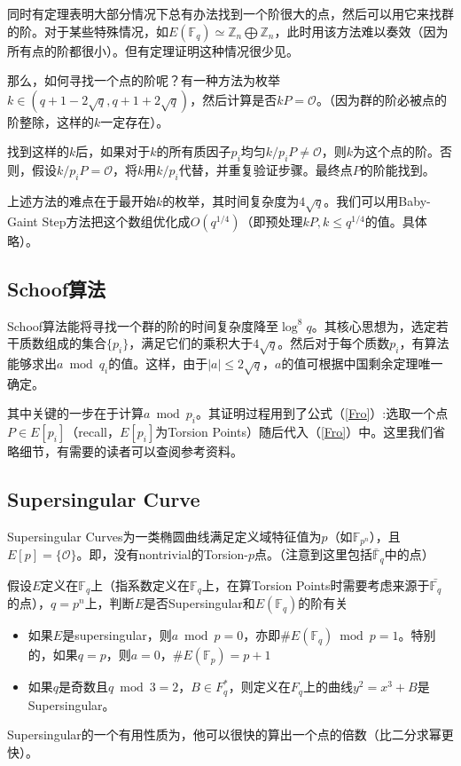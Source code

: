 \documentclass[12pt]{article}
\newcommand{\oo}{\mathcal{O}}
\newcommand{\fp}{\mathbb{F}_p}
\newcommand{\fpn}{\mathbb{F}_{p^n}}
\newcommand{\fq}{\mathbb{F}_q}
\begin{document}
同时有定理表明大部分情况下总有办法找到一个阶很大的点，然后可以用它来找群的阶。对于某些特殊情况，如$E(\mathbb{F}_q) \simeq \mathbb{Z}_n \bigoplus  \mathbb{Z}_n$，此时用该方法难以奏效（因为所有点的阶都很小）。但有定理证明这种情况很少见。

那么，如何寻找一个点的阶呢？有一种方法为枚举$k \in (q+1-2\sqrt{q},q+1+2\sqrt{q})$，然后计算是否$kP = \oo$。（因为群的阶必被点的阶整除，这样的$k$一定存在）。

找到这样的$k$后，如果对于$k$的所有质因子$p_i$均匀$k/p_i P \neq \oo$，则$k$为这个点的阶。否则，假设$k/p_i P = \oo$，将$k$用$k/p_i$代替，并重复验证步骤。最终点$P$的阶能找到。

上述方法的难点在于最开始$k$的枚举，其时间复杂度为$4\sqrt{q}$。我们可以用Baby-Gaint Step方法把这个数组优化成$O(q^{1/4})$（即预处理$kP, k \leq q^{1/4}$的值。具体略）。
\subsection{Schoof算法}
Schoof算法能将寻找一个群的阶的时间复杂度降至$\log^8 q$。其核心思想为，选定若干质数组成的集合$\{p_i\}$，满足它们的乘积大于$4\sqrt{q}$。然后对于每个质数$p_i$，有算法能够求出$a \bmod q_i$的值。这样，由于$|a| \leq 2\sqrt{q}$，$a$的值可根据中国剩余定理唯一确定。

其中关键的一步在于计算$a \bmod p_i$。其证明过程用到了公式（\ref{Fro}）:选取一个点$P \in E[p_i]$（recall，$E[p_i]$为Torsion Points）随后代入（\ref{Fro}）中。这里我们省略细节，有需要的读者可以查阅参考资料。
\subsection{Supersingular Curve}
Supersingular Curves为一类椭圆曲线满足定义域特征值为$p$（如$\fpn$），且$E[p] = \{\oo \}$。即，没有nontrivial的Torsion-$p$点。（注意到这里包括$\bar{\mathbb{F}}_q$中的点）

假设$E$定义在$\fq$上（指系数定义在$\fq$上，在算Torsion Points时需要考虑来源于$\bar{\mathbb{F}_q}$的点），$q=p^n$上，判断$E$是否Supersingular和$E(\fq)$的阶有关
\begin{itemize}
	\item 如果$E$是supersingular，则$a \bmod p =0$，亦即$\# E(\fq) \bmod p =1$。特别的，如果$q=p$，则$a=0$，$\# E(\fp)=p+1$
	\item 如果$q$是奇数且$q \bmod 3=2$，$B \in F^*_q$，则定义在$F_q$上的曲线$y^2=x^3+B$是Supersingular。
\end{itemize}
Supersingular的一个有用性质为，他可以很快的算出一个点的倍数（比二分求幂更快）。%
\end{document}
